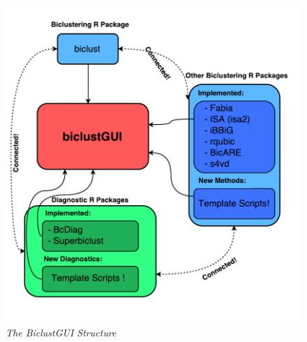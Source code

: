 \documentclass[a4paper]{article}\usepackage[]{graphicx}\usepackage[]{color}
\begin{document}
\begin{figure}[H]
\centering
\includegraphics[scale=0.9]{figures/biclustGUI_diagram.pdf}
\caption{{\it The BiclustGUI Structure }\label{biclustGUI_struc}}
\end{figure}
\end{document}
